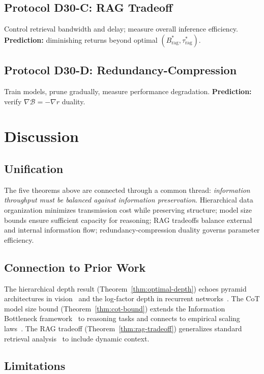 \documentclass[12pt]{article}
\theoremstyle{definition}
\theoremstyle{remark}
\begin{document}
\subsection{Protocol D30-C: RAG Tradeoff}
Control retrieval bandwidth and delay; measure overall inference efficiency. \textbf{Prediction:} diminishing returns beyond optimal $(B_{\mathrm{rag}}^*, \tau_{\mathrm{rag}}^*)$.

\subsection{Protocol D30-D: Redundancy-Compression}
Train models, prune gradually, measure performance degradation. \textbf{Prediction:} verify $\nabla \mathcal{B} = -\nabla r$ duality.

\section{Discussion}

\subsection{Unification}

The five theorems above are connected through a common thread: \emph{information throughput must be balanced against information preservation}. Hierarchical data organization minimizes transmission cost while preserving structure; model size bounds ensure sufficient capacity for reasoning; RAG tradeoffs balance external and internal information flow; redundancy-compression duality governs parameter efficiency.

\subsection{Connection to Prior Work}

The hierarchical depth result (Theorem~\ref{thm:optimal-depth}) echoes pyramid architectures in vision~\cite{lin2016feature} and the log-factor depth in recurrent networks~\cite{ba2016layer}. The CoT model size bound (Theorem~\ref{thm:cot-bound}) extends the Information Bottleneck framework~\cite{tishby2000information} to reasoning tasks and connects to empirical scaling laws~\cite{kaplan2020scaling, hoffmann2022training}. The RAG tradeoff (Theorem~\ref{thm:rag-tradeoff}) generalizes standard retrieval analysis~\cite{gao2024retrieval} to include dynamic context.

\subsection{Limitations}
\end{document}
